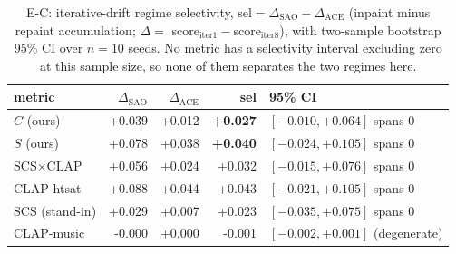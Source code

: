\begin{table}[t]
\centering
\caption[Iterative-drift regime selectivity]{E-C: iterative-drift regime selectivity, $\text{sel}=\Delta_{\text{SAO}}-\Delta_{\text{ACE}}$ (inpaint minus repaint accumulation; $\Delta=$ score$_{\text{iter1}}-$score$_{\text{iter8}}$), with two-sample bootstrap 95\% CI over $n{=}10$ seeds. No metric has a selectivity interval excluding zero at this sample size, so none of them separates the two regimes here.}
\label{tab:selectivity}
\begin{tabular}{lrrrl}
\toprule
metric & $\Delta_{\text{SAO}}$ & $\Delta_{\text{ACE}}$ & sel & 95\% CI \\
\midrule
$C$ (ours) & +0.039 & +0.012 & \textbf{+0.027} & $[-0.010,+0.064]$ spans 0 \\
$S$ (ours) & +0.078 & +0.038 & \textbf{+0.040} & $[-0.024,+0.105]$ spans 0 \\
\midrule
SCS$\times$CLAP & +0.056 & +0.024 & +0.032 & $[-0.015,+0.076]$ spans 0 \\
CLAP-htsat & +0.088 & +0.044 & +0.043 & $[-0.021,+0.105]$ spans 0 \\
SCS (stand-in) & +0.029 & +0.007 & +0.023 & $[-0.035,+0.075]$ spans 0 \\
CLAP-music & -0.000 & +0.000 & -0.001 & $[-0.002,+0.001]$ (degenerate) \\
\bottomrule
\end{tabular}
\end{table}
